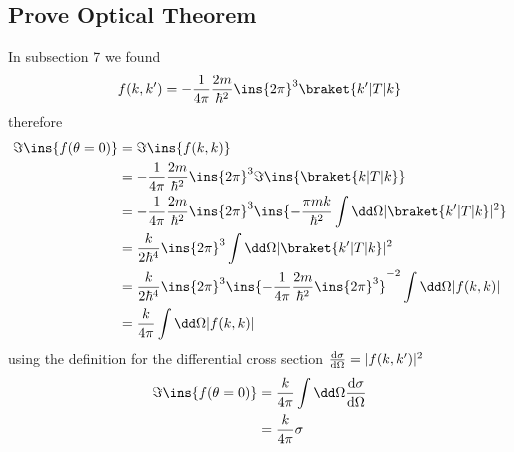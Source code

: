 \subsection{Prove Optical Theorem}
In subsection 7 we found
\begin{align}
	f(k,k') = -\frac{1}{4\pi}\frac{2m}{\hbar^2}\ins{2\pi}^3\braket{k'\vert T \vert k}
\end{align}
therefore
\begin{align}
	\Im\ins{f(\theta = 0)} &= \Im\ins{f(k,k)} \\
	&= -\frac{1}{4\pi}\frac{2m}{\hbar^2}\ins{2\pi}^3\Im\ins{\braket{k\vert T \vert k}}\\
	&= -\frac{1}{4\pi}\frac{2m}{\hbar^2}\ins{2\pi}^3\ins{-\frac{\pi mk}{\hbar^2 }\int \dd \Omega \lvert\braket{k'\vert T \vert k}\rvert^2}\\
	&= \frac{k}{2\hbar^4}\ins{2\pi}^3\int \dd \Omega \lvert\braket{k'\vert T \vert k}\rvert^2 \\
	&= \frac{k}{2\hbar^4}\ins{2\pi}^3 \ins{-\frac{1}{4\pi}\frac{2m}{\hbar^2}\ins{2\pi}^3}^{-2}\int\dd\Omega \lvert f(k,k)\rvert \\
	&= \frac{k}{4\pi}\int\dd\Omega \lvert f(k,k)\rvert
\end{align}
using the definition for the differential cross section \(\diff{\sigma}{\Omega} = \lvert f(k,k')\rvert^2\)
\begin{align}
	\Im\ins{f(\theta = 0)} &= \frac{k}{4\pi}\int\dd\Omega\diff{\sigma}{\Omega}\\
	&= \frac{k}{4\pi}\sigma
\end{align}